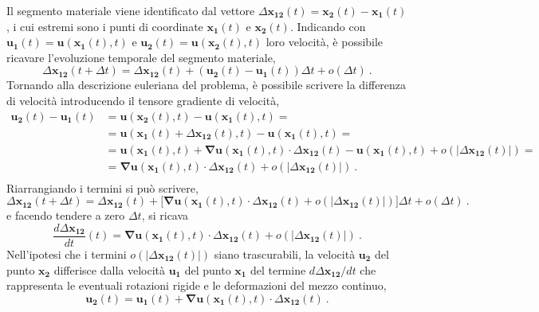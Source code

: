 Il segmento materiale viene identificato dal vettore $\Delta\bm{x_{12}}(t) = \bm{x_2}(t) - \bm{x_1}(t)$, i cui estremi sono i punti di coordinate $\bm{x_1}(t)$ e $\bm{x_2}(t)$. Indicando con $\bm{u_1}(t) = \bm{u}(\bm{x_1}(t),t)$ e $\bm{u_2}(t) = \bm{u}(\bm{x_2}(t),t)$ loro velocità, è possibile ricavare l'evoluzione temporale del segmento materiale,
\begin{equation}
 \Delta\bm{x_{12}}(t+\Delta t) = \Delta\bm{x_{12}}(t) + \left( \bm{u_2}(t) - \bm{u_1}(t) \right) \Delta t + o(\Delta t) \ .
\end{equation}
Tornando alla descrizione euleriana del problema, è possibile scrivere la differenza di velocità introducendo il tensore gradiente di velocità,
\begin{equation}
\begin{aligned}
 \bm{u_2}(t) - \bm{u_1}(t) & = \bm{u}(\bm{x_2}(t),t) - \bm{u}(\bm{x_1}(t),t) = \\
 & = \bm{u}\left(\bm{x_1}(t)+\Delta\bm{x_{12}}(t),t\right) - \bm{u}\left(\bm{x_1}(t),t\right) = \\
 & = \bm{u}\left(\bm{x_1}(t),t\right) + \bm{\nabla}\bm{u}\left(\bm{x_1}(t),t\right) \cdot \Delta\bm{x_{12}}(t) - \bm{u}\left(\bm{x_1}(t),t\right) + o(|\Delta\bm{x_{12}}(t)|) = \\
 & = \bm{\nabla}\bm{u}\left(\bm{x_1}(t),t\right) \cdot \Delta\bm{x_{12}}(t) + o(|\Delta\bm{x_{12}}(t)|) \ . \\
 \end{aligned}
\end{equation}
Riarrangiando i termini si può scrivere,
\begin{equation}\label{eqn:cin:material-segm}
 \Delta\bm{x_{12}}(t+\Delta t) = \Delta\bm{x_{12}}(t) + 
 \big[ \bm{\nabla}\bm{u}\left(\bm{x_1}(t),t\right) \cdot \Delta\bm{x_{12}}(t) + o(|\Delta\bm{x_{12}}(t)|) \big] \Delta t + o(\Delta t) \ .
\end{equation}
e facendo tendere a zero $\Delta t$, si ricava
\begin{equation}
 \dfrac{d \Delta\bm{x_{12}}}{d t}(t) = \bm{\nabla}\bm{u}\left(\bm{x_1}(t),t\right) \cdot \Delta\bm{x_{12}}(t) + o(|\Delta\bm{x_{12}}(t)|) \ .
\end{equation}
%
Nell'ipotesi che i termini $o(|\Delta \bm{x_{12}}(t)|)$ siano trascurabili, la velocità $\bm{u_2}$ del punto $\bm{x_2}$ differisce dalla velocità $\bm{u_1}$ del punto $\bm{x_1}$ del termine $d \Delta\bm{x_{12}}/d t$ che rappresenta le eventuali rotazioni rigide e le deformazioni del mezzo continuo,
\begin{equation}\label{eqn:cin:relative-vel-1}
 \bm{u_2}(t) = \bm{u_1}(t) + \bm{\nabla}\bm{u}\left(\bm{x_1}(t),t\right) \cdot \Delta\bm{x_{12}}(t) \ .
\end{equation}
 

